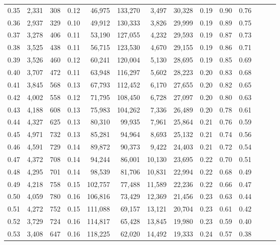 \begin{tabular}{rrrrrrrrrrrrrr}
0.35 &  2,331 &  308 &  0.12 &   46,975 &  133,270 &   3,497 &  30,328 &  0.19 &  0.90 &      0.76 \\
0.36 &  2,937 &  329 &  0.10 &   49,912 &  130,333 &   3,826 &  29,999 &  0.19 &  0.89 &      0.75 \\
0.37 &  3,278 &  406 &  0.11 &   53,190 &  127,055 &   4,232 &  29,593 &  0.19 &  0.87 &      0.73 \\
0.38 &  3,525 &  438 &  0.11 &   56,715 &  123,530 &   4,670 &  29,155 &  0.19 &  0.86 &      0.71 \\
0.39 &  3,526 &  460 &  0.12 &   60,241 &  120,004 &   5,130 &  28,695 &  0.19 &  0.85 &      0.69 \\
0.40 &  3,707 &  472 &  0.11 &   63,948 &  116,297 &   5,602 &  28,223 &  0.20 &  0.83 &      0.68 \\
0.41 &  3,845 &  568 &  0.13 &   67,793 &  112,452 &   6,170 &  27,655 &  0.20 &  0.82 &      0.65 \\
0.42 &  4,002 &  558 &  0.12 &   71,795 &  108,450 &   6,728 &  27,097 &  0.20 &  0.80 &      0.63 \\
0.43 &  4,188 &  608 &  0.13 &   75,983 &  104,262 &   7,336 &  26,489 &  0.20 &  0.78 &      0.61 \\
0.44 &  4,327 &  625 &  0.13 &   80,310 &   99,935 &   7,961 &  25,864 &  0.21 &  0.76 &      0.59 \\
0.45 &  4,971 &  732 &  0.13 &   85,281 &   94,964 &   8,693 &  25,132 &  0.21 &  0.74 &      0.56 \\
0.46 &  4,591 &  729 &  0.14 &   89,872 &   90,373 &   9,422 &  24,403 &  0.21 &  0.72 &      0.54 \\
0.47 &  4,372 &  708 &  0.14 &   94,244 &   86,001 &  10,130 &  23,695 &  0.22 &  0.70 &      0.51 \\
0.48 &  4,295 &  701 &  0.14 &   98,539 &   81,706 &  10,831 &  22,994 &  0.22 &  0.68 &      0.49 \\
0.49 &  4,218 &  758 &  0.15 &  102,757 &   77,488 &  11,589 &  22,236 &  0.22 &  0.66 &      0.47 \\
0.50 &  4,059 &  780 &  0.16 &  106,816 &   73,429 &  12,369 &  21,456 &  0.23 &  0.63 &      0.44 \\
0.51 &  4,272 &  752 &  0.15 &  111,088 &   69,157 &  13,121 &  20,704 &  0.23 &  0.61 &      0.42 \\
0.52 &  3,729 &  724 &  0.16 &  114,817 &   65,428 &  13,845 &  19,980 &  0.23 &  0.59 &      0.40 \\
0.53 &  3,408 &  647 &  0.16 &  118,225 &   62,020 &  14,492 &  19,333 &  0.24 &  0.57 &      0.38 \\

\end{tabular}
